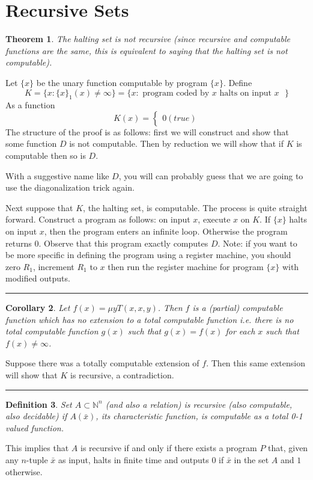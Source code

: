 \documentclass[twoside]{article}
\newcounter{lecnum}
\newtheorem{theorem}{Theorem}[lecnum]
\newtheorem{corollary}[theorem]{Corollary}
\newtheorem{definition}[theorem]{Definition}
\newenvironment{proof}{{\bf Proof:}}{\hfill\rule{2mm}{2mm}}
\def\N{\mathbb{N}}
\begin{document}
\section{Recursive Sets}
\begin{theorem}
The halting set is not recursive (since recursive and computable functions are the same, this is equivalent to saying that the halting set is not computable).
\end{theorem}
\begin{proof}
Let $\{x\}$ be the unary function computable by program $\{x\}$. Define
\[K = \{x: \{x\}_1(x) \neq \infty\} = \{x: \mbox{ program coded by $x$ halts on input $x$ } \}\]
As a function 
\[K(x) = \begin{cases}
0 (true)
\end{cases}\]
The structure of the proof is as follows: first we will construct and show that some function $D$ is not computable. Then by reduction we will show that if $K$ is computable then so is $D$. 

With a suggestive name like $D$, you will can probably guess that we are going to use the diagonalization trick again.

Next suppose that $K$, the halting set, is computable. The process is quite straight forward. Construct a program as follows: on input $x$, execute $x$ on $K$. If $\{x\}$ halts on input $x$, then the program enters an infinite loop. Otherwise the program returns $0$. Observe that this program exactly computes $D$. Note: if you want to be more specific in defining the program using a register machine, you should zero $R_1$, increment $R_1$ to $x$ then run the register machine for program $\{x\}$ with modified outputs.
\end{proof}

\begin{corollary}
Let $f(x) = \mu yT(x,x,y)$. Then $f$ is a (partial) computable function which has no extension to a total computable function i.e. there is no total computable function $g(x)$ such that $g(x) = f(x)$ for each $x$ such that $f(x) \neq \infty$.
\end{corollary}
\begin{proof}
Suppose there was a totally computable extension of $f$. Then this same extension will show that $K$ is recursive, a contradiction.
\end{proof}

\begin{definition}
Set $A \subset \N^n$ (and also a relation) is \emph{recursive} (also computable, also decidable) if $A(\bar{x})$, its characteristic function, is computable as a total 0-1 valued function. 
\end{definition}
This implies that $A$ is recursive if and only if there exists a program $P$ that, given any $n$-tuple $\bar{x}$ as input, halts in finite time and outputs $0$ if $\bar{x}$ in the set $A$ and $1$ otherwise. 
\end{document}
